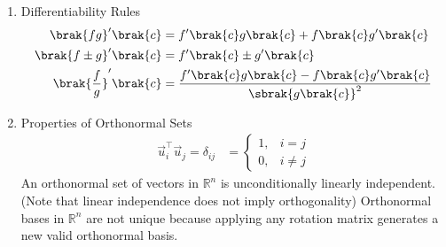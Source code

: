 \begin{enumerate}[label=\thesubsection.\arabic*, ref=\thesubsection.\theenumi]
\item Differentiability Rules
\begin{align}
	\brak{fg}'\brak{c} &= f'\brak{c}g\brak{c} + f\brak{c}g'\brak{c} \label{eq:DA2025-differentiability_rules}
	\\
	\brak{f \pm g}'\brak{c} &= f'\brak{c} \pm g'\brak{c}
	\\
	\brak{\frac{f}{g}}'\brak{c} &= \frac{f'\brak{c}g\brak{c} - f\brak{c}g'\brak{c}}{\sbrak{g\brak{c}}^2}
\end{align}
	\item Properties of Orthonormal Sets
	\begin{align}
		\vec{u}_i^\top \vec{u}_j = \delta_{ij} &= \left\{
		\begin{array}{ll}
			1, & i = j \\
			0, & i \neq j
		\end{array}
		\right. \label{eq:DA2025-orthonormal}
	\end{align}
	An orthonormal set of vectors in $\mathbb{R}^n$ is unconditionally linearly independent.(Note that linear independence does not imply orthogonality) Orthonormal bases in $\mathbb{R}^n$ are not unique because applying any rotation matrix generates a new valid orthonormal basis.
	

\end{enumerate}

